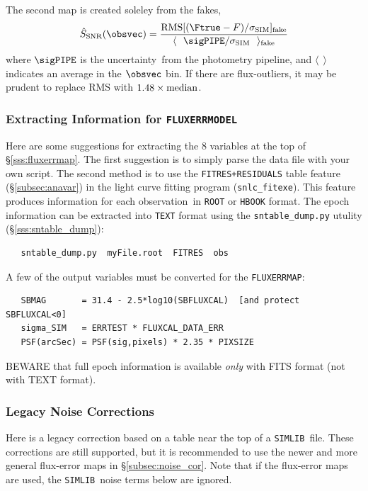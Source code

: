 \documentclass[12pt]{article}
\newcommand{\unc}{uncertainty}
\newcommand{\simlib}{{\tt SIMLIB}}
\newcommand{\obs}{observation}
\newcommand{\sigSIM}{\sigma_{\rm SIM}}
\newcommand{\SSNR}{\hat{S}_{\rm SNR}}
\begin{document}
{The second map is created soleley from the fakes,
%
\begin{equation}
  \SSNR(\obsvec) = 
       \frac{ {\rm RMS}[(\Ftrue-F)/\sigSIM ]_{\rm fake} }
            { \langle~~\sigPIPE/\sigSIM ~~\rangle_{\rm fake} }
   \label{eq:SSNRmap2}
\end{equation}
%
where $\sigPIPE$ is the \unc\ from the photometry pipeline,
and $\langle~~\rangle$ indicates an average in the $\obsvec$ bin.
If there are flux-outliers, it may be prudent to replace RMS
with $1.48\times {\rm median}$.

\subsubsection{Extracting Information for {\tt FLUXERRMODEL} }
\label{sss:fluxerrmap_info}

Here are some suggestions for extracting the 8 variables
at the top of \S\ref{sss:fluxerrmap}. The first suggestion
is to simply parse the data file with your own script.
The second method is to use the {\tt FITRES+RESIDUALS} table
feature (\S\ref{subsec:anavar}) 
in the light curve fitting program ({\tt snlc\_fitexe}).
This feature produces information
for each \obs\ in {\tt ROOT} or {\tt HBOOK} format.
The epoch information can be extracted into {\tt TEXT} format
using the {\tt sntable\_dump.py} utulity (\S\ref{sss:sntable_dump}):
\begin{verbatim}
   sntable_dump.py  myFile.root  FITRES  obs
\end{verbatim}
A few of the output variables must be converted for the
{\tt FLUXERRMAP}:
%
\begin{verbatim}
   SBMAG       = 31.4 - 2.5*log10(SBFLUXCAL)  [and protect SBFLUXCAL<0]
   sigma_SIM   = ERRTEST * FLUXCAL_DATA_ERR
   PSF(arcSec) = PSF(sig,pixels) * 2.35 * PIXSIZE
\end{verbatim}
%
BEWARE that full epoch information is available {\it only}
with FITS format (not with TEXT format).

\clearpage
\subsubsection{ Legacy Noise Corrections }
\label{sss:noise_cor_legacy}

Here is a legacy correction based on a table near the top
of a \simlib\ file. These corrections are still supported,
but it is recommended to use the newer and more general
flux-error maps in \S\ref{subsec:noise_cor}.
Note that if the flux-error maps are used, the \simlib\ noise
terms below are ignored.

}
\end{document}
